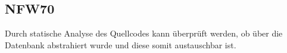 \subsection*{NFW70}

Durch \gls{statische Analyse} des \Gls{Quellcode}s kann überprüft werden, ob über die \Gls{Datenbank} abstrahiert wurde und diese somit austauschbar ist.